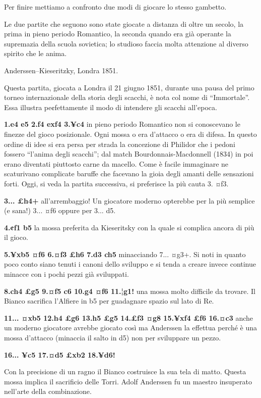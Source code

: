 Per finire mettiamo a confronto due modi di giocare lo stesso gambetto.

Le due partite che seguono sono state giocate a distanza di oltre un
secolo, la prima in pieno periodo Romantico, la seconda quando era già
operante la supremazia della scuola sovietica; lo studioso faccia molta
attenzione al diverso spirito che le anima.

Anderssen--Kieseritzky, Londra 1851.

Questa partita, giocata a Londra il 21 giugno 1851, durante una pausa
del primo torneo internazionale della storia degli scacchi, è nota col
nome di ``Immortale''. Essa illustra pe¢fettamente il modo di intendere
gli scacchi all'epoca.

\textbf{1.e4 e5 2.f4 exf4 3.¥c4} in pieno periodo Romantico non si
conoscevano le finezze del gioco posizionale. Ogni mossa o era d'attacco
o era di difesa. In questo ordine di idee si era persa per strada la
concezione di Philidor che i pedoni fossero ``l'anima degli scacchi'';
dal match Bourdonnais-Macdonnell (1834) in poi erano diventati piuttosto
carne da macello. Come è facile immaginare ne scaturivano complicate
baruffe che facevano la gioia degli amanti delle sensazioni forti. Oggi,
si veda la partita successiva, si preferisce la più cauta 3. ¤f3.

\textbf{3... £h4+} all'arrembaggio! Un giocatore moderno opterebbe per
la più semplice (e sana!) 3... ¤f6 oppure per 3... d5.

\textbf{4.¢f1 b5} la mossa preferita da Kieseritsky con la quale si
complica ancora di più il gioco.

\textbf{5.¥xb5 ¤f6 6.¤f3 £h6 7.d3 ch5} minacciando 7... ¤g3+. Si noti in
quanto poco conto siano tenuti i canoni dello sviluppo e si tenda a
creare invece continue minacce con i pochi pezzi già sviluppati.

\textbf{8.ch4 £g5 9.¤f5 c6 10.g4 ¤f6 11.¦g1!} una mossa molto difficile
da trovare. Il Bianco sacrifica l'Alfiere in b5 per guadagnare spazio
sul lato di Re.

\textbf{11... ¤xb5 12.h4 £g6 13.h5 £g5 14.£f3 ¤g8 15.¥xf4 £f6 16.¤c3}
anche un moderno giocatore avrebbe giocato così ma Anderssen la effettua
perché è una mossa d'attacco (minaccia il salto in d5) non per
sviluppare un pezzo.

\textbf{16... ¥c5 17.¤d5 £xb2 18.¥d6!}


Con la precisione di un ragno il Bianco costruisce la sua tela di matto.
Questa mossa implica il sacrificio delle Torri. Adolf Anderssen fu un
maestro insuperato nell'arte della combinazione.

